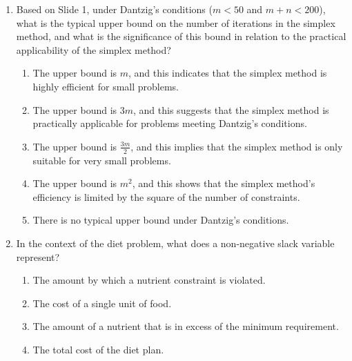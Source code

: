 \documentclass{article}%
\begin{document}
\begin{enumerate}
\begin{enumerate}%
\item The exponential worst-case complexity of the method.%
\item The difficulty in defining a realistic probability distribution for real-world linear programming problems.%
\item The dependence of the method's performance on the specific pivot rule used.%
\item The high dimensionality of many practical linear programming problems.%
\item The lack of efficient algorithms for generating random linear programming problems.%
\end{enumerate}%
\vspace{1em}%
\item Based on Slide 1, under Dantzig's conditions ($m < 50$ and $m + n < 200$), what is the typical upper bound on the number of iterations in the simplex method, and what is the significance of this bound in relation to the practical applicability of the simplex method?%
\begin{enumerate}%
\item The upper bound is $m$, and this indicates that the simplex method is highly efficient for small problems.%
\item The upper bound is $3m$, and this suggests that the simplex method is practically applicable for problems meeting Dantzig's conditions.%
\item The upper bound is $\frac{3m}{2}$, and this implies that the simplex method is only suitable for very small problems.%
\item The upper bound is $m^2$, and this shows that the simplex method's efficiency is limited by the square of the number of constraints.%
\item There is no typical upper bound under Dantzig's conditions.%
\end{enumerate}%
\vspace{1em}%
\item In the context of the diet problem, what does a non-negative slack variable represent?%
\begin{enumerate}%
\item The amount by which a nutrient constraint is violated.%
\item The cost of a single unit of food.%
\item The amount of a nutrient that is in excess of the minimum requirement.%
\item The total cost of the diet plan.%

\end{enumerate}
\end{enumerate}
\end{document}
